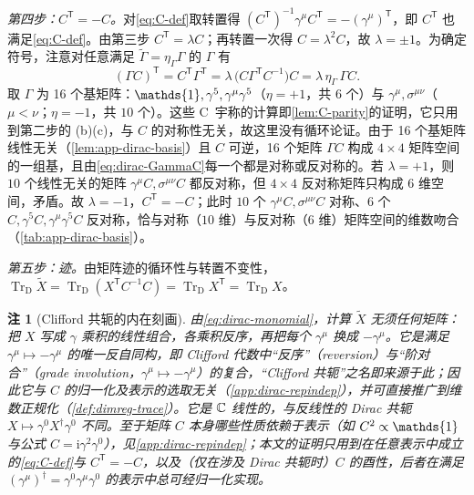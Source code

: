 \documentclass[UTF8,a4paper,11pt,fontset=fandol]{ctexart}
\makeatletter
\let\amsmathbb\mathbb
\renewcommand{\mathbb}[1]{\ifx1#1\mathds{1}\else\amsmathbb{#1}\fi}
\theoremstyle{cplain}
\theoremstyle{cdefinition}
\theoremstyle{cremark}
\newtheorem{remark}[theorem]{注}
\renewcommand{\proofname}{证明}
\renewenvironment{proof}[1][\proofname]{\par\pushQED{\qed}\normalfont\topsep6\p@\@plus6\p@\relax
  \trivlist\item[\hskip\labelsep\itshape #1\hspace{0.5em}]\ignorespaces}{\popQED\endtrivlist\@endpefalse}
\numberwithin{equation}{section}
\newcommand{\TrD}{\operatorname{Tr}_{\mathrm{D}}}   %
\newcommand{\tp}{\mathsf{T}}                         %
\newcommand{\ii}{\mathrm{i}}                        %
\newcommand{\Cconj}[1]{\widetilde{#1}}              %
\makeatother
\begin{document}
\begin{proof}
\emph{第四步：$C^{\tp}=-C$。}对\cref{eq:C-def}取转置得 $(C^{\tp})^{-1}\gamma^\mu C^{\tp}=-(\gamma^\mu)^{\tp}$，即 $C^{\tp}$ 也满足\cref{eq:C-def}。由第三步 $C^{\tp}=\lambda C$；再转置一次得 $C=\lambda^2C$，故 $\lambda=\pm1$。为确定符号，注意对任意满足 $\Cconj\Gamma=\eta_\Gamma\Gamma$ 的 $\Gamma$ 有
\begin{equation}\label{eq:dirac-GammaC}
(\Gamma C)^{\tp}=C^{\tp}\Gamma^{\tp}=\lambda\,\bigl(C\Gamma^{\tp}C^{-1}\bigr)C=\lambda\,\eta_\Gamma\,\Gamma C .
\end{equation}
取 $\Gamma$ 为 16 个基矩阵：$\mathbb 1,\gamma^5,\gamma^\mu\gamma^5$（$\eta=+1$，共 $6$ 个）与 $\gamma^\mu,\sigma^{\mu\nu}$（$\mu<\nu$；$\eta=-1$，共 $10$ 个）。这些 C~宇称的计算即\cref{lem:C-parity}的证明，它只用到第二步的 (b)(c)，与 $C$ 的对称性无关，故这里没有循环论证。由于 16 个基矩阵线性无关（\cref{lem:app-dirac-basis}）且 $C$ 可逆，16 个矩阵 $\Gamma C$ 构成 $4\times4$ 矩阵空间的一组基，且由\cref{eq:dirac-GammaC}每一个都是对称或反对称的。若 $\lambda=+1$，则 $10$ 个线性无关的矩阵 $\gamma^\mu C,\sigma^{\mu\nu}C$ 都反对称，但 $4\times4$ 反对称矩阵只构成 $6$ 维空间，矛盾。故 $\lambda=-1$，$C^{\tp}=-C$；此时 $10$ 个 $\gamma^\mu C,\sigma^{\mu\nu}C$ 对称、$6$ 个 $C,\gamma^5C,\gamma^\mu\gamma^5C$ 反对称，恰与对称（$10$ 维）与反对称（$6$ 维）矩阵空间的维数吻合（\cref{tab:app-dirac-basis}）。

\emph{第五步：迹。}由矩阵迹的循环性与转置不变性，$\TrD\Cconj X=\TrD(X^{\tp}C^{-1}C)=\TrD X^{\tp}=\TrD X$。
\end{proof}

\begin{remark}[Clifford 共轭的内在刻画]\label{rem:dirac-intrinsic}
由\cref{eq:dirac-monomial}，计算 $\Cconj X$ 无须任何矩阵：把 $X$ 写成 $\gamma$ 乘积的线性组合，各乘积反序，再把每个 $\gamma^\mu$ 换成 $-\gamma^\mu$。它是满足 $\gamma^\mu\mapsto-\gamma^\mu$ 的唯一反自同构，即 Clifford 代数中“反序”（reversion）与“阶对合”（grade involution，$\gamma^\mu\mapsto-\gamma^\mu$）的复合，“Clifford 共轭”之名即来源于此；因此它与 $C$ 的归一化及表示的选取无关（\cref{app:dirac-repindep}），并可直接推广到维数正规化（\cref{def:dimreg-trace}）。它是 $\mathbb C$ 线性的，与反线性的 Dirac 共轭 $X\mapsto\gamma^0X^\dagger\gamma^0$ 不同。至于矩阵 $C$ 本身哪些性质依赖于表示（如 $C^2\propto\mathbb 1$ 与公式 $C=\ii\gamma^2\gamma^0$），见\cref{app:dirac-repindep}；本文的证明只用到在任意表示中成立的\cref{eq:C-def}与 $C^{\tp}=-C$，以及（仅在涉及 Dirac 共轭时）$C$ 的酉性，后者在满足 $(\gamma^\mu)^\dagger=\gamma^0\gamma^\mu\gamma^0$ 的表示中总可经归一化实现。
\end{remark}
\end{document}
